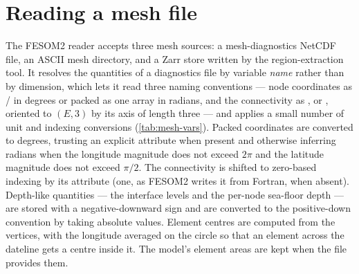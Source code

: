 \section{Reading a mesh file}\label{sec:mesh-conventions}

The FESOM2 reader accepts three mesh sources: a mesh-diagnostics NetCDF file, an ASCII mesh directory, and
a Zarr store written by the region-extraction tool. It resolves the quantities of a diagnostics file by
variable \emph{name} rather than by dimension, which lets it read three naming conventions --- node
coordinates as / in degrees or packed as one  array in radians, and the
connectivity as ,  or , oriented to $(E,3)$ by its axis of
length three --- and applies a small number of unit and indexing conversions (\cref{tab:mesh-vars}). Packed
coordinates are converted to degrees, trusting an explicit  attribute when present and otherwise
inferring radians when the longitude magnitude does not exceed $2\pi$ and the latitude magnitude does not
exceed $\pi/2$. The connectivity is shifted to zero-based indexing by its  attribute
(one, as FESOM2 writes it from Fortran, when absent). Depth-like quantities --- the interface levels and the
per-node sea-floor depth --- are stored with a negative-downward sign and are converted to the positive-down
convention by taking absolute values. Element centres are computed from the vertices, with the longitude
averaged on the circle so that an element across the dateline gets a centre inside it. The model's element
areas are kept when the file provides them.

